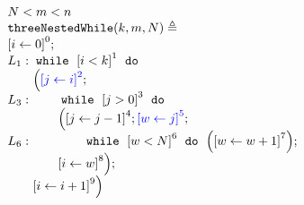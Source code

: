     { \footnotesize
    \begin{figure}
    \centering
    \begin{subfigure}{.3\textwidth}
      \[
        \begin{array}{l}
            N < m < n\\
            \kw{threeNestedWhile}(k, m, N) \triangleq \\
            \clabel{ \assign{i}{0} }^{0} ; \\
                L_1: \ewhile ~ \clabel{i < k}^{1} ~ \edo ~ \\
                \qquad \Big(
                 \highlight{\clabel{\assign{j}{i}}^{2}} ;\\
                 L_3:  \qquad \ewhile ~ \clabel{j > 0}^{3} ~ \edo ~ \\
                 \qquad \qquad \Big(
                  \clabel{\assign{j}{j-1}}^{4};
                  \highlight{\clabel{\assign{w}{j}}^{5}};\\
                  L_6:  \qquad \qquad \ewhile ~ \clabel{w < N}^{6} ~ \edo ~
                  \Big(
                    \clabel{\assign{w}{w + 1}}^{7}
                      \Big); \\
                      \qquad \qquad \clabel{\assign{i}{w}}^{8}
                      \Big); \\
                      \qquad \clabel{\assign{i}{i+1}}^{9}
                  \Big)
            \end{array}
        \]
    \end{subfigure}
    \begin{subfigure}{.3\textwidth}
        \begin{centering}
        \begin{tikzpicture}[scale=\textwidth/15cm,samples=200]
    \end{tikzpicture}
    \caption{}
    \end{centering}
    \end{subfigure}
    \begin{subfigure}{.5\textwidth}
\end{subfigure}
\end{figure}}
